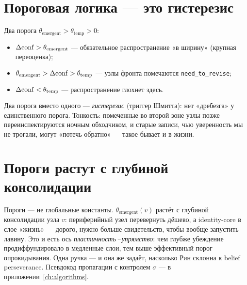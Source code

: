 \section{Пороговая логика — это гистерезис}

Два порога $\theta_{\text{emergent}}>\theta_{\text{temp}}>0$:
\begin{itemize}
\item $\Delta\mathrm{conf}>\theta_{\text{emergent}}$ — обязательное распространение «в
ширину» (крупная переоценка);
\item $\theta_{\text{emergent}}>\Delta\mathrm{conf}>\theta_{\text{temp}}$ — узлы фронта
помечаются \texttt{need\_to\_revise};
\item $\Delta\mathrm{conf}<\theta_{\text{temp}}$ — распространение глохнет здесь.
\end{itemize}
Два порога вместо одного — \emph{гистерезис} (триггер Шмитта): нет «дребезга» у
единственного порога. Тонкость: помеченные во второй зоне узлы позже
переинспектируются ночным обходчиком, и старые записи, чью уверенность мы не
трогали, могут «потечь обратно» — такое бывает и в жизни.

\section{Пороги растут с глубиной консолидации}

Пороги — не глобальные константы. $\theta_{\text{emergent}}(v)$ растёт с глубиной
консолидации узла $v$: периферийный узел перевернуть дёшево, а identity-core в слое
«жизнь» — дорого, нужно больше свидетельств, чтобы вообще запустить лавину. Это и
есть ось \emph{пластичность\,--\,упрямство}: чем глубже убеждение продиффундировало
в медленные слои, тем выше эффективный порог опрокидывания. Одна ручка — и она же
задаёт, насколько Рин склонна к belief perseverance. Псевдокод пропагации с
контролем $\sigma$ — в приложении~\ref{ch:algorithms}.
